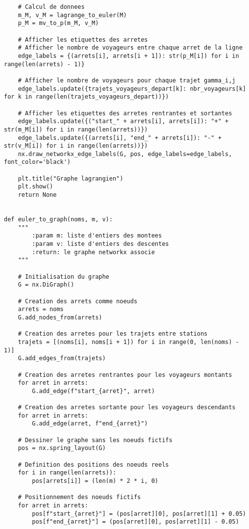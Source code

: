 \documentclass[12pt]{article}
\begin{document}
\begin{lstlisting}
    # Calcul de donnees
    m_M, v_M = lagrange_to_euler(M)
    p_M = mv_to_p(m_M, v_M)

    # Afficher les etiquettes des arretes
    # Afficher le nombre de voyageurs entre chaque arret de la ligne
    edge_labels = {(arrets[i], arrets[i + 1]): str(p_M[i]) for i in range(len(arrets) - 1)}

    # Afficher le nombre de voyageurs pour chaque trajet gamma_i,j
    edge_labels.update({trajets_voyageurs_depart[k]: nbr_voyageurs[k] for k in range(len(trajets_voyageurs_depart))})

    # Afficher les etiquettes des arretes rentrantes et sortantes
    edge_labels.update({("start_" + arrets[i], arrets[i]): "+" + str(m_M[i]) for i in range(len(arrets))})
    edge_labels.update({(arrets[i], "end_" + arrets[i]): "-" + str(v_M[i]) for i in range(len(arrets))})
    nx.draw_networkx_edge_labels(G, pos, edge_labels=edge_labels, font_color='black')

    plt.title("Graphe lagrangien")
    plt.show()
    return None


def euler_to_graph(noms, m, v):
    """
        :param m: liste d'entiers des montees
        :param v: liste d'entiers des descentes
        :return: le graphe networkx associe
    """

    # Initialisation du graphe
    G = nx.DiGraph()

    # Creation des arrets comme noeuds
    arrets = noms
    G.add_nodes_from(arrets)

    # Creation des arretes pour les trajets entre stations
    trajets = [(noms[i], noms[i + 1]) for i in range(0, len(noms) - 1)]
    G.add_edges_from(trajets)

    # Creation des arretes rentrantes pour les voyageurs montants
    for arret in arrets:
        G.add_edge(f"start_{arret}", arret)

    # Creation des arretes sortante pour les voyageurs descendants
    for arret in arrets:
        G.add_edge(arret, f"end_{arret}")

    # Dessiner le graphe sans les noeuds fictifs
    pos = nx.spring_layout(G)

    # Definition des positions des noeuds reels
    for i in range(len(arrets)):
        pos[arrets[i]] = (len(m) * 2 * i, 0)

    # Positionnement des noeuds fictifs
    for arret in arrets:
        pos[f"start_{arret}"] = (pos[arret][0], pos[arret][1] + 0.05)
        pos[f"end_{arret}"] = (pos[arret][0], pos[arret][1] - 0.05)


\end{lstlisting}
\end{document}
